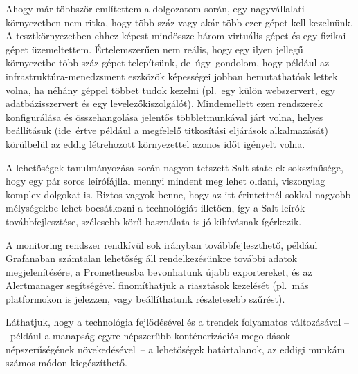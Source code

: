 Ahogy már többször említettem a dolgozatom során, egy nagyvállalati környezetben nem ritka, hogy több száz vagy akár több ezer gépet kell kezelnünk. A tesztkörnyezetben ehhez képest mindössze három virtuális gépet és egy fizikai gépet üzemeltettem. Értelemszerűen nem reális, hogy egy ilyen jellegű környezetbe több száz gépet telepítsünk, de~úgy~gondolom, hogy például az infrastruktúra-menedzsment eszközök képességei jobban bemutathatóak lettek volna, ha néhány géppel többet tudok kezelni (pl.~egy külön webszervert, egy adatbázisszervert és egy levelezőkiszolgálót). Mindemellett ezen rendszerek konfigurálása és összehangolása jelentős többletmunkával járt volna, helyes beállításuk (ide~értve például a megfelelő titkosítási eljárások alkalmazását) körülbelül az eddig létrehozott környezettel azonos időt igényelt volna.

A lehetőségek tanulmányozása során nagyon tetszett Salt state-ek sokszínűsége, hogy egy pár soros leírófájllal mennyi mindent meg lehet oldani, viszonylag komplex dolgokat is. Biztos vagyok benne, hogy az itt érintettnél sokkal nagyobb mélységekbe lehet bocsátkozni a technológiát illetően, így a Salt-leírók továbbfejlesztése, szélesebb körű használata is jó kihívásnak ígérkezik.

A monitoring rendszer rendkívül sok irányban továbbfejleszthető, például Grafanaban számtalan lehetőség áll rendelkezésünkre további adatok megjelenítésére, a Prometheusba bevonhatunk újabb exportereket, és az Alertmanager segítségével finomíthatjuk a riasztások kezelését (pl.~más platformokon is jelezzen, vagy beállíthatunk részletesebb szűrést).

Láthatjuk, hogy a technológia fejlődésével és a trendek folyamatos változásával --~például a manapság egyre népszerűbb konténerizációs megoldások népszerűségének növekedésével~-- a lehetőségek határtalanok, az eddigi munkám számos módon kiegészíthető.